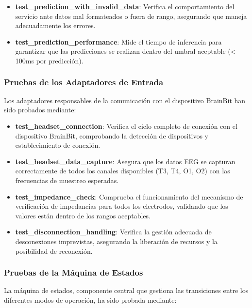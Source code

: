 \begin{table}[ht]
\begin{itemize}
    \item \textbf{test\_prediction\_with\_invalid\_data}: Verifica el comportamiento del servicio ante datos mal formateados o fuera de rango, asegurando que maneja adecuadamente los errores.
    
    \item \textbf{test\_prediction\_performance}: Mide el tiempo de inferencia para garantizar que las predicciones se realizan dentro del umbral aceptable (< 100ms por predicción).
\end{itemize}

\subsubsection{Pruebas de los Adaptadores de Entrada}

Los adaptadores responsables de la comunicación con el dispositivo BrainBit han sido probados mediante:

\begin{itemize}
    \item \textbf{test\_headset\_connection}: Verifica el ciclo completo de conexión con el dispositivo BrainBit, comprobando la detección de dispositivos y establecimiento de conexión.
    
    \item \textbf{test\_headset\_data\_capture}: Asegura que los datos EEG se capturan correctamente de todos los canales disponibles (T3, T4, O1, O2) con las frecuencias de muestreo esperadas.
    
    \item \textbf{test\_impedance\_check}: Comprueba el funcionamiento del mecanismo de verificación de impedancias para todos los electrodos, validando que los valores están dentro de los rangos aceptables.
    
    \item \textbf{test\_disconnection\_handling}: Verifica la gestión adecuada de desconexiones imprevistas, asegurando la liberación de recursos y la posibilidad de reconexión.
\end{itemize}

\subsubsection{Pruebas de la Máquina de Estados}

La máquina de estados, componente central que gestiona las transiciones entre los diferentes modos de operación, ha sido probada mediante:


\end{table}
